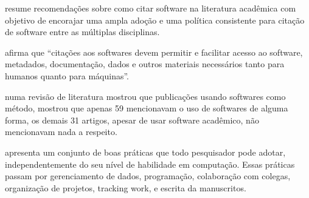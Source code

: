  resume recomendações sobre como citar software
na literatura acadêmica com objetivo de encorajar uma ampla adoção e uma
política consistente para citação de software entre as múltiplas disciplinas.

 afirma que ``citações aos softwares devem
permitir e facilitar acesso ao software, metadados, documentação, dados e
outros materiais necessários tanto para humanos quanto para máquinas''.


numa revisão de literatura mostrou que publicações usando softwares como
método, mostrou que apenas 59 mencionavam o uso de softwares de alguma forma,
os demais 31 artigos, apesar de usar software acadêmico, não mencionavam nada a
respeito.

 apresenta um conjunto de boas práticas que todo
pesquisador pode adotar, independentemente do seu nível de habilidade em
computação. Essas práticas passam por gerenciamento de dados, programação,
colaboração com colegas, organização de projetos, tracking work, e escrita da
manuscritos.


